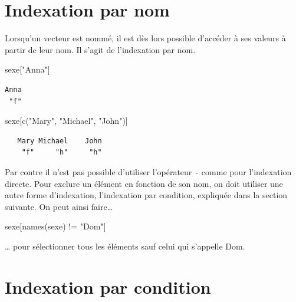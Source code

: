 \documentclass[
  letterpaper,
  DIV=11,
  numbers=noendperiod,
  oneside]{scrreprt}
\newenvironment{Shaded}{\begin{snugshade}}{\end{snugshade}}
\newcommand{\FunctionTok}[1]{\textcolor[rgb]{0.28,0.35,0.67}{#1}}
\newcommand{\NormalTok}[1]{\textcolor[rgb]{0.00,0.23,0.31}{#1}}
\newcommand{\SpecialCharTok}[1]{\textcolor[rgb]{0.37,0.37,0.37}{#1}}
\newcommand{\StringTok}[1]{\textcolor[rgb]{0.13,0.47,0.30}{#1}}
\begin{document}
\hypertarget{indexation-par-nom}{%
\section{Indexation par nom}\label{indexation-par-nom}}

Lorsqu'un vecteur est nommé, il est dès lors possible d'accéder à ses
valeurs à partir de leur nom. Il s'agit de l'indexation par nom.

\begin{Shaded}
\begin{Highlighting}[]
\NormalTok{sexe[}\StringTok{"Anna"}\NormalTok{]}
\end{Highlighting}
\end{Shaded}

\begin{verbatim}
Anna 
 "f" 
\end{verbatim}

\begin{Shaded}
\begin{Highlighting}[]
\NormalTok{sexe[}\FunctionTok{c}\NormalTok{(}\StringTok{"Mary"}\NormalTok{, }\StringTok{"Michael"}\NormalTok{, }\StringTok{"John"}\NormalTok{)]}
\end{Highlighting}
\end{Shaded}

\begin{verbatim}
   Mary Michael    John 
    "f"     "h"     "h" 
\end{verbatim}

Par contre il n'est pas possible d'utiliser l'opérateur \texttt{-} comme
pour l'indexation directe. Pour exclure un élément en fonction de son
nom, on doit utiliser une autre forme d'indexation, l'indexation par
condition, expliquée dans la section suivante. On peut ainsi
faire\ldots{}

\begin{Shaded}
\begin{Highlighting}[]
\NormalTok{sexe[}\FunctionTok{names}\NormalTok{(sexe) }\SpecialCharTok{!=} \StringTok{"Dom"}\NormalTok{]}
\end{Highlighting}
\end{Shaded}

\ldots{} pour sélectionner tous les éléments sauf celui qui s'appelle
Dom.

\hypertarget{indexation-par-condition}{%
\section{Indexation par condition}\label{indexation-par-condition}}
\end{document}
